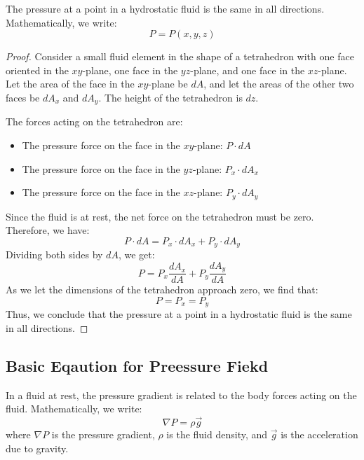 \documentclass[11pt]{report}
\begin{document}
\begin{theorem}
    The pressure at a point in a hydrostatic fluid is the same in all directions. Mathematically, we write:
    \begin{equation}
        P = P(x,y,z)
    \end{equation}
\end{theorem}

\begin{proof}
    Consider a small fluid element in the shape of a tetrahedron with one face oriented in the \(xy\)-plane, one face in the \(yz\)-plane, and one face in the \(xz\)-plane. Let the area of the face in the \(xy\)-plane be \(dA\), and let the areas of the other two faces be \(dA_x\) and \(dA_y\). The height of the tetrahedron is \(dz\).

    The forces acting on the tetrahedron are:
    \begin{itemize}
        \item The pressure force on the face in the \(xy\)-plane: \(P \cdot dA\)
        \item The pressure force on the face in the \(yz\)-plane: \(P_x \cdot dA_x\)
        \item The pressure force on the face in the \(xz\)-plane: \(P_y \cdot dA_y\)
    \end{itemize}

    Since the fluid is at rest, the net force on the tetrahedron must be zero. Therefore, we have:
    \[
    P \cdot dA = P_x \cdot dA_x + P_y \cdot dA_y
    \]
    Dividing both sides by \(dA\), we get:
    \[
    P = P_x \frac{dA_x}{dA} + P_y \frac{dA_y}{dA}
    \]
    As we let the dimensions of the tetrahedron approach zero, we find that:
    \[
    P = P_x = P_y
    \]
    Thus, we conclude that the pressure at a point in a hydrostatic fluid is the same in all directions.
\end{proof}


\subsection{Basic Eqaution for Preessure Fiekd}
\begin{theorem}
    In a fluid at rest, the pressure gradient is related to the body forces acting on the fluid. Mathematically, we write:
    \begin{equation}
        \nabla P = \rho \vec{g}
    \end{equation}
    where \(\nabla P\) is the pressure gradient, \(\rho\) is the fluid density, and \(\vec{g}\) is the acceleration due to gravity. 
\end{theorem}
\end{document}
